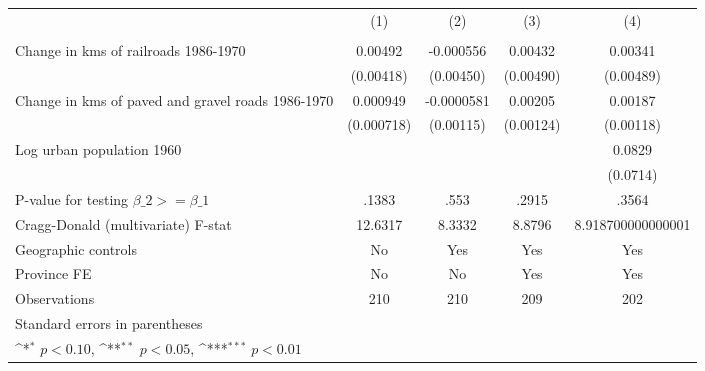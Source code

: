 {
\def\sym#1{\ifmmode^{#1}\else\(^{#1}\)\fi}
\begin{tabular}{l*{4}{c}}
\hline\hline
                &\multicolumn{1}{c}{(1)}&\multicolumn{1}{c}{(2)}&\multicolumn{1}{c}{(3)}&\multicolumn{1}{c}{(4)}\\
                &\multicolumn{1}{c}{}&\multicolumn{1}{c}{}&\multicolumn{1}{c}{}&\multicolumn{1}{c}{}\\
\hline
Change in kms of railroads 1986-1970&  0.00492         &-0.000556         &  0.00432         &  0.00341         \\
                &(0.00418)         &(0.00450)         &(0.00490)         &(0.00489)         \\
[1em]
Change in kms of paved and gravel roads 1986-1970& 0.000949         &-0.0000581         &  0.00205         &  0.00187         \\
                &(0.000718)         &(0.00115)         &(0.00124)         &(0.00118)         \\
[1em]
Log urban population 1960&                  &                  &                  &   0.0829         \\
                &                  &                  &                  & (0.0714)         \\
\hline
P-value for testing $\beta\_{2} >= \beta\_{1}$&    .1383         &     .553         &    .2915         &    .3564         \\
Cragg-Donald (multivariate) F-stat&  12.6317         &   8.3332         &   8.8796         &8.918700000000001         \\
Geographic controls&       No         &      Yes         &      Yes         &      Yes         \\
Province FE     &       No         &       No         &      Yes         &      Yes         \\
Observations    &      210         &      210         &      209         &      202         \\
\hline\hline
\multicolumn{5}{l}{\footnotesize Standard errors in parentheses}\\
\multicolumn{5}{l}{\footnotesize \sym{*} \(p<0.10\), \sym{**} \(p<0.05\), \sym{***} \(p<0.01\)}\\
\end{tabular}
}
